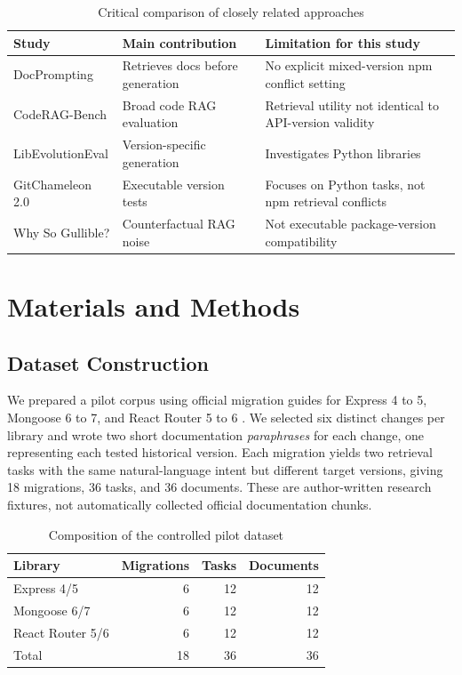 \documentclass[conference]{IEEEtran}
\begin{document}
\begin{table}[t]
\centering
\caption{Critical comparison of closely related approaches}
\label{tab:related}
\setlength{\tabcolsep}{2.7pt}
\begin{tabular}{p{}p{}p{}}
\toprule
Study & Main contribution & Limitation for this study\\
\midrule
DocPrompting \cite{docprompting} & Retrieves docs before generation & No explicit mixed-version npm conflict setting\\
CodeRAG-Bench \cite{coderag} & Broad code RAG evaluation & Retrieval utility not identical to API-version validity\\
LibEvolutionEval \cite{libevolution} & Version-specific generation & Investigates Python libraries\\
GitChameleon 2.0 \cite{gitchameleon} & Executable version tests & Focuses on Python tasks, not npm retrieval conflicts\\
Why So Gullible? \cite{gullible} & Counterfactual RAG noise & Not executable package-version compatibility\\
\bottomrule
\end{tabular}
\end{table}

\section{Materials and Methods}

\subsection{Dataset Construction}
We prepared a pilot corpus using official migration guides for Express 4 to 5, Mongoose 6 to 7, and React Router 5 to 6 \cite{express,mongoose,router}. We selected six distinct changes per library and wrote two short documentation \emph{paraphrases} for each change, one representing each tested historical version. Each migration yields two retrieval tasks with the same natural-language intent but different target versions, giving 18 migrations, 36 tasks, and 36 documents. These are author-written research fixtures, not automatically collected official documentation chunks.

\begin{table}[t]
\centering
\caption{Composition of the controlled pilot dataset}
\label{tab:data}
\begin{tabular}{lrrr}
\toprule
Library & Migrations & Tasks & Documents\\
\midrule
Express 4/5 & 6 & 12 & 12\\
Mongoose 6/7 & 6 & 12 & 12\\
React Router 5/6 & 6 & 12 & 12\\
\midrule
Total & 18 & 36 & 36\\
\bottomrule
\end{tabular}
\end{table}
\end{document}
